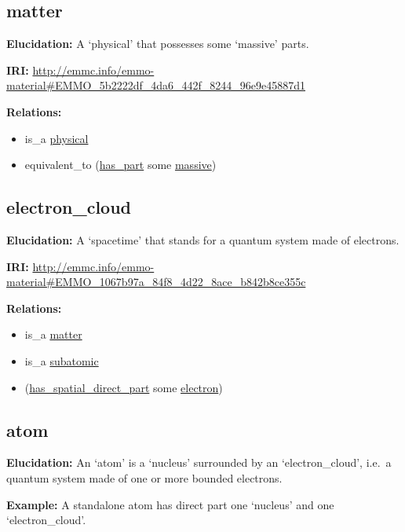 \documentclass[a4paper,]{report}
\providecommand{\tightlist}{%
  \setlength{\itemsep}{0pt}\setlength{\parskip}{0pt}}
\begin{document}
\hypertarget{matter}{%
\subsection{matter}\label{matter}}

\textbf{Elucidation:} A `physical' that possesses some `massive' parts.

\textbf{IRI:}
\url{http://emmc.info/emmo-material\#EMMO_5b2222df_4da6_442f_8244_96e9e45887d1}

\textbf{Relations:}

\begin{itemize}
\tightlist
\item
  is\_a \protect\hyperlink{physical}{physical}
\item
  equivalent\_to (\protect\hyperlink{has_part}{has\_part} some
  \protect\hyperlink{massive}{massive})
\end{itemize}

\hypertarget{electron_cloud-1}{%
\subsection{electron\_cloud}\label{electron_cloud-1}}

\textbf{Elucidation:} A `spacetime' that stands for a quantum system
made of electrons.

\textbf{IRI:}
\url{http://emmc.info/emmo-material\#EMMO_1067b97a_84f8_4d22_8ace_b842b8ce355c}

\textbf{Relations:}

\begin{itemize}
\tightlist
\item
  is\_a \protect\hyperlink{matter}{matter}
\item
  is\_a \protect\hyperlink{subatomic}{subatomic}
\item
  (\protect\hyperlink{has_spatial_direct_part}{has\_spatial\_direct\_part}
  some \protect\hyperlink{electron}{electron})
\end{itemize}

\hypertarget{atom-1}{%
\subsection{atom}\label{atom-1}}

\textbf{Elucidation:} An `atom' is a `nucleus' surrounded by an
`electron\_cloud', i.e.~a quantum system made of one or more bounded
electrons.

\textbf{Example:} A standalone atom has direct part one `nucleus' and
one `electron\_cloud'.
\end{document}
